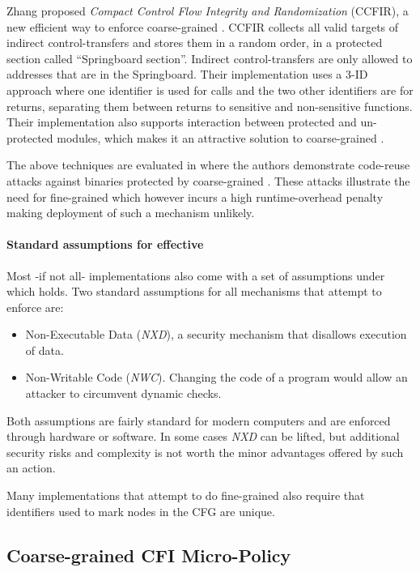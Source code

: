 Zhang \ETAL \cite{Zhang2013} proposed \emph{Compact Control Flow Integrity
and Randomization} (CCFIR), a new efficient way to enforce coarse-grained \CFI.
CCFIR collects all valid targets of indirect control-transfers and stores them
in a random order, in a protected section called ``Springboard section''. 
Indirect control-transfers are only allowed to addresses that are in the
Springboard. Their implementation uses a 3-ID approach where one identifier is
used for calls and the two other identifiers are for returns, separating them
between returns to sensitive and non-sensitive functions. Their implementation
also supports interaction between protected and un-protected modules, which
makes it an attractive solution to coarse-grained \CFI.

The above techniques are evaluated in \cite{outofcontrol_ieeesp2014} where
the authors demonstrate code-reuse attacks against binaries protected by
coarse-grained \CFI. These attacks illustrate the need for fine-grained
\CFI which however incurs a high runtime-overhead penalty making deployment
of such a mechanism unlikely.

\paragraph{Standard assumptions for effective \CFI}\label{sec:cfi_assumptions}

Most -if not all- \CFI implementations also come with a set of assumptions under
which \CFI holds. Two standard assumptions for all mechanisms that attempt to
enforce \CFI are:
\begin{itemize}
\item Non-Executable Data (\emph{NXD}), a security
mechanism that disallows execution of data. 
\item Non-Writable Code (\emph{NWC}). Changing the code of a
program would allow an attacker to circumvent dynamic checks.
\end{itemize}

Both assumptions are fairly standard for modern computers and are enforced
through hardware or software. In some cases \emph{NXD} can be lifted, but
additional security risks and complexity is not worth the minor advantages
offered by such an action.

Many implementations that attempt to do fine-grained \CFI also require that
identifiers used to mark nodes in the CFG are unique.

\subsection{Coarse-grained CFI Micro-Policy}\label{sec:cfi_coarse}

